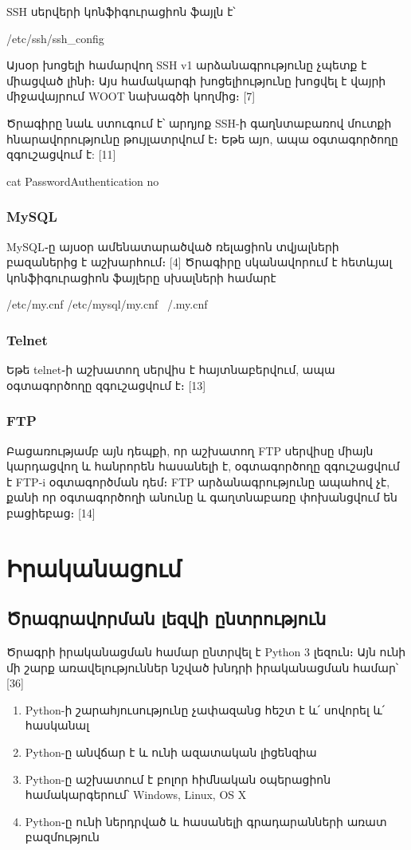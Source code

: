 \documentclass[12pt]{article}
\begin{document}
\begin{sloppypar}
SSH սերվերի կոնֆիգուրացիոն ֆայլն է՝

    /etc/ssh/ssh\_config

Այսօր խոցելի համարվող SSH v1 արձանագրությունը չպետք է միացված լինի։
Այս համակարգի խոցելիությունը խոցվել է վայրի միջավայրում WOOT
նախագծի կողմից։ [7]

Ծրագիրը նաև ստուգում է՝ արդյոք SSH-ի գաղնտաբառով մուտքի
հնարավորությունը թույլատրվում է։ Եթե այո, ապա օգտագործողը
զգուշացվում է: [11]

    cat PasswordAuthentication no

\subsubsection{MySQL}

MySQL֊ը այսօր ամենատարածված ռելացիոն տվյալների բազաներից է աշխարհում։ [4]
Ծրագիրը սկանավորում է հետևյալ կոնֆիգուրացիոն ֆայլերը սխալների համարէ

    /etc/my.cnf
    /etc/mysql/my.cnf
    ~/.my.cnf

\subsubsection{Telnet}

Եթե telnet֊ի աշխատող սերվիս է հայտնաբերվում, ապա օգտագործողը զգուշացվում է։
[13]

\subsubsection{FTP}

Բացառությամբ այն դեպքի, որ աշխատող FTP սերվիսը միայն կարդացվող և
հանրորեն հասանելի է, օգտագործողը զգուշացվում է FTP-i օգտագործման դեմ։
FTP արձանագրությունը ապահով չէ, քանի որ օգտագործողի անունը և
գաղտնաբառը փոխանցվում են բացիեբաց։ [14]


\section{Իրականացում}


\subsection{Ծրագրավորման լեզվի ընտրություն}


Ծրագրի իրականացման համար ընտրվել է Python 3 լեզուն։
Այն ունի մի շարք առավելություններ նշված խնդրի իրականացման համար՝
[36]
\begin{enumerate}
\item Python-ի շարահյուսությունը չափազանց հեշտ է և՛ սովորել և՛ հասկանալ
\item Python-ը անվճար է և ունի ազատական լիցենզիա
\item Python-ը աշխատում է բոլոր հիմնական օպերացիոն համակարգերում՝ Windows, Linux, OS X
\item Python֊ը ունի ներդրված և հասանելի գրադարանների առատ բազմություն
\end{enumerate}



\end{sloppypar}
\end{document}
